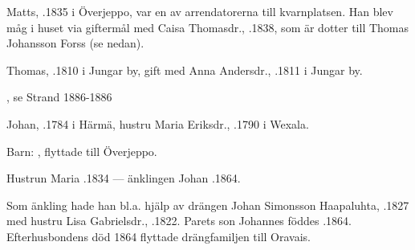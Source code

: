 

Matts, .1835 i Överjeppo, var en av arrendatorerna till kvarnplatsen. Han blev måg i huset via giftermål med Caisa Thomasdr., .1838, som är dotter till Thomas Johansson Forss (se nedan).
\begin{jhchildren}
  \item {}
  \item {}
  \item {}
  \item {}
\end{jhchildren}


Thomas, .1810 i Jungar by, gift med Anna Andersdr., .1811 i Jungar by.
\begin{jhchildren}
  \item {}
  \item {}
  \item {}
  \item {}
  \item {}
  \item {}
  \item {}
  \item {}, se Strand 1886-1886
\end{jhchildren}


Johan, .1784 i Härmä, hustru Maria Eriksdr., .1790 i Wexala.

Barn: , flyttade till Överjeppo.

Hustrun Maria .1834 --- änklingen Johan .1864.

Som änkling hade han bl.a. hjälp av drängen Johan Simonsson Haapaluhta, .1827 med hustru Lisa Gabrielsdr., .1822. Parets son Johannes föddes .1864. Efterhusbondens död 1864 flyttade drängfamiljen till Oravais.






